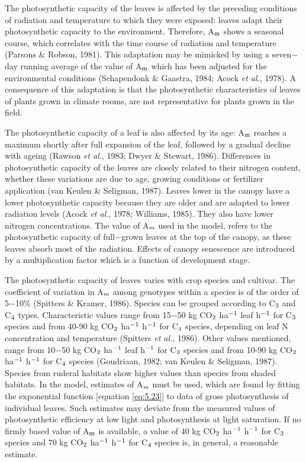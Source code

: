 The photosynthetic capacity of the leaves is affected by the preceding conditions of
radiation and temperature to which they were exposed: leaves adapt their photosynthetic
capacity to the environment. Therefore, A$_{{\rm m}}$ shows a seasonal course, which correlates
with the time course of radiation and temperature (Parsons \& Robson, 1981). This
adaptation may be mimicked by using a seven$-$day running average of the value of A$_{{\rm m}}$
which has been adjusted for the environmental conditions (Schapendonk \& Gaastra, 1984;
Acock {\it et al.}, 1978). A consequence of this adaptation is that the photosynthetic 
characteristics of leaves of plants grown in climate rooms, are not representative for plants grown
in the field.

The photosynthetic capacity of a leaf is also affected by its age: A$_{{\rm m}}$ reaches a maximum
shortly after full expansion of the leaf, followed by a gradual decline with ageing
(Rawson {\it et al.}, 1983; Dwyer \& Stewart, 1986). Differences in photosynthetic capacity of
the leaves are closely related to their nitrogen content, whether these variations are due to
age, growing conditions or fertilizer application (van Keulen \& Seligman, 1987). Leaves
lower in the canopy have a lower photosynthetic capacity because they are older and are
adapted to lower radiation levels (Acock {\it et al.}, 1978; Williams, 1985). They also have
lower nitrogen concentrations. The value of A$_{{\rm m}}$ used in the model, refers to the
photosynthetic capacity of full$-$grown leaves at the top of the canopy, as these leaves
absorb most of the radiation. Effects of canopy senescence are introduced by a multiplication 
factor which is a function of development stage.

The photosynthetic capacity of leaves varies with crop species and cultivar. The coefficient of
variation in A$_{{\rm m}}$ among genotypes within a species is of the order of 5$-$10\%
(Spitters \& Kramer, 1986). Species can be grouped according to C$_{{\rm 3}}$ and C$_{{\rm 4}}$ types.
Characteristic values range from 15$-$50 kg CO$_{{\rm 2}}$ ha$^{{\rm -}{1}}$ leaf h$^{{\rm -}{1}}$ 
for C$_{{\rm 3}}$ species and from 40-90
kg CO$_{{\rm 2}}$ ha$^{{\rm -1}}$ h$^{{\rm -1}}$ for C$_{{\rm 4}}$ species, depending on leaf 
N concentration and temperature (Spitters {\it et al.}, 1986). Other values mentioned, 
range from 10$-$50 kg CO$_{{\rm 2}}$ ha$^{{\rm -}{1}}$ leaf h$^{{\rm -}{1}}$ for
C$_{{\rm 3}}$ species and from 10-90 kg CO$_{{\rm 2}}$ ha$^{{\rm -1}}$ h$^{{\rm -1}}$ 
for C$_{{\rm 4}}$ species (Goudriaan, 1982; van Keulen \&
Seligman, 1987). Species from ruderal habitats show higher values than species from
shaded habitats. In the model, estimates of A$_{{\rm m}}$ must be used, which are found by fitting
the exponential function [equation \ref{eq:5.23}] to data of gross photosynthesis of individual
leaves. Such estimates may deviate from the measured values of photosynthetic efficiency
at low light and photosynthesis at light saturation. If no firmly based value of A$_{{\rm m}}$ is
available, a value of 40 kg CO$_{{\rm 2}}$ ha$^{{\rm -1}}$ h$^{{\rm -}{1}}$ for C$_{{\rm 3}}$ 
species and 70 kg CO$_{{\rm 2}}$ ha$^{{\rm -1}}$ h$^{{\rm -1}}$ for C$_{{\rm 4}}$
species is, in general, a reasonable estimate.

